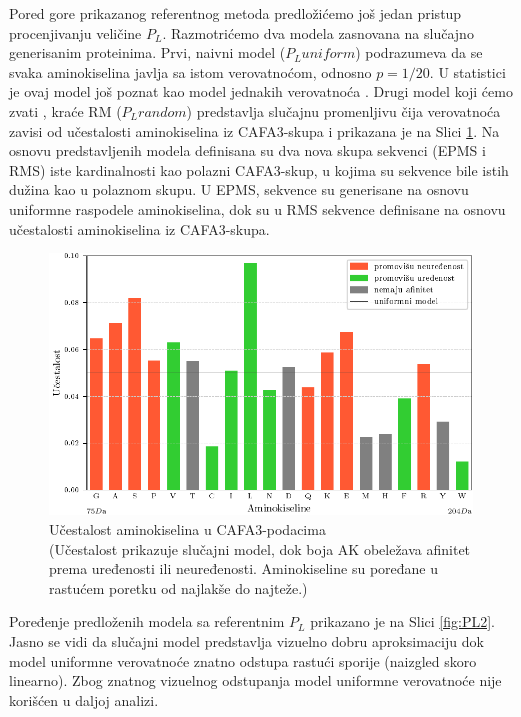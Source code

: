 Pored gore prikazanog referentnog metoda predložićemo još jedan pristup
procenjivanju veličine $P_L$.
Razmotrićemo dva modela zasnovana na slučajno generisanim proteinima. Prvi,
naivni model  ($P_L uniform$) podrazumeva da se svaka
aminokiselina javlja sa istom verovatnoćom, odnosno $p=1/20$. U statistici je ovaj
model još poznat kao model jednakih verovatnoća .
Drugi model koji ćemo zvati , kraće
RM ($P_L random$)  predstavlja slučajnu promenljivu čija verovatnoća zavisi od učestalosti
aminokiselina iz CAFA3-skupa i prikazana je na Slici \ref{fig:AK_ucestalost}.
Na osnovu predstavljenih modela definisana su dva nova skupa sekvenci (EPMS i
RMS) iste kardinalnosti kao polazni CAFA3-skup, u kojima su sekvence bile istih
dužina kao u polaznom skupu. U EPMS, sekvence su generisane na osnovu uniformne
raspodele aminokiselina, dok su u RMS sekvence definisane na osnovu učestalosti
aminokiselina iz CAFA3-skupa.


\begin{figure}[th]
\centering
\includegraphics[]{plots/AK_ucestalost}
\caption{
  Učestalost aminokiselina u CAFA3-podacima
  \\ \footnotesize
  (Učestalost prikazuje slučajni model, dok boja AK obeležava afinitet prema
  uređenosti ili neuređenosti. Aminokiseline su poređane u rastućem poretku
  od najlakše do najteže.) 
}
\label{fig:AK_ucestalost}
\end{figure}

Poređenje predloženih modela sa referentnim $P_L$ prikazano je na Slici
\ref{fig:PL2}. Jasno se vidi da slučajni model predstavlja vizuelno dobru
aproksimaciju dok model uniformne verovatnoće znatno odstupa rastući sporije (naizgled
skoro linearno).
Zbog znatnog vizuelnog odstupanja model uniformne verovatnoće nije korišćen u daljoj analizi.


